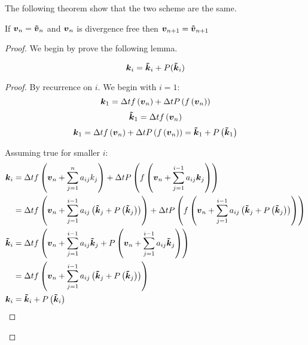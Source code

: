 The following theorem show that the two scheme are the same.

\begin{theorem}
If ${\boldsymbol {v}}_{n}={\boldsymbol {\tilde{v}}}_{n}$ and ${\boldsymbol {v}}_n$ is divergence free then ${\boldsymbol {v}}_{n+1}={\boldsymbol {\tilde{v}}}_{n+1}$ 
\end{theorem}
\begin{proof}
We begin by prove the following lemma.
\begin{lemma}
\begin{equation}
  {\boldsymbol {k}}_{i}={\boldsymbol {\tilde{k}}}_{i}+P({\boldsymbol {\tilde{k}}}_{i})
\end{equation}
\end{lemma}
\begin{proof}
By recurrence on $i$.
We begin with $i=1$:
\begin{equation}
  {\boldsymbol {k}}_{1}=\Delta tf\left({\boldsymbol {v}}_n\right)+\Delta tP\left(f\left({\boldsymbol {v}}_n\right)\right)
\end{equation}
\begin{equation}
{\boldsymbol {\tilde{k}}}_{1}=\Delta tf\left({\boldsymbol {v}}_n\right)
\end{equation}
\begin{equation}
  {\boldsymbol {k}}_{1}=\Delta t f\left({\boldsymbol {v}}_n\right)+\Delta tP\left(f\left({\boldsymbol {v}}_n\right)\right)={\boldsymbol {\tilde{k}}}_1+P\left({\boldsymbol {\tilde{k}}}_1\right)
\end{equation}

Assuming true for smaller $i$:
\begin{align*}
  {\boldsymbol {k}}_{i}&=\Delta tf\left({\boldsymbol {v}}_n+\sum_{j=1}^{n}a_{ij}k_{j}\right)+\Delta tP\left(f\left({\boldsymbol {v}}_n+\sum_{j=1}^{i-1}a_{ij}{\boldsymbol {k}}_{j}\right)\right)\\
  &=\Delta tf\left({\boldsymbol {v}}_n+\sum_{j=1}^{i-1}a_{ij}\left({\boldsymbol {\tilde{k}}}_{j}+P\left({\boldsymbol {\tilde{k}}}_{j}\right)\right)\right)+\Delta tP\left(f\left({\boldsymbol {v}}_n+\sum_{j=1}^{i-1}a_{ij}\left({\boldsymbol {\tilde{k}}}_{j}+P\left({\boldsymbol {\tilde{k}}}_{j}\right)\right)\right)\right)\\
  {\boldsymbol {\tilde{k}}}_{i}&=\Delta tf\left({\boldsymbol {v}}_n+\sum_{j=1}^{i-1}a_{ij}{\boldsymbol {\tilde{k}}}_{j}+P\left({\boldsymbol {v}}_n+\sum_{j=1}^{i-1}a_{ij}{\boldsymbol {\tilde{k}}}_{j}\right)\right)\\
  &=\Delta tf\left({\boldsymbol {v}}_n+\sum_{j=1}^{i-1}a_{ij}\left({\boldsymbol {\tilde{k}}}_{j}+P\left({\boldsymbol {\tilde{k}}}_{j}\right)\right)\right)\\
  {\boldsymbol {k}}_{i}&={\boldsymbol {\tilde{k}}}_{i}+P\left({\boldsymbol {\tilde{k}}}_{i}\right)
\end{align*}
\end{proof}


\end{proof}
